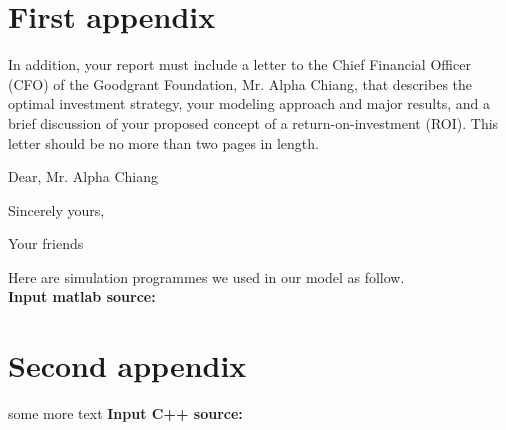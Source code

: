 \documentclass{mcmthesis}
\begin{document}
\begin{appendices}

\section{First appendix}

In addition, your report must include a letter to the Chief Financial Officer (CFO) of the Goodgrant Foundation, Mr. Alpha Chiang, that describes the optimal investment strategy, your modeling approach and major results, and a brief discussion of your proposed concept of a return-on-investment (ROI). This letter should be no more than two pages in length.

\begin{letter}{Dear, Mr. Alpha Chiang}

\lipsum[1-2]

\vspace{\parskip}

Sincerely yours,

Your friends

\end{letter}
Here are simulation programmes we used in our model as follow.\\

\textbf{\textcolor[rgb]{0.98,0.00,0.00}{Input matlab source:}}


\section{Second appendix}

some more text \textcolor[rgb]{0.98,0.00,0.00}{\textbf{Input C++ source:}}


\end{appendices}
\end{document}
